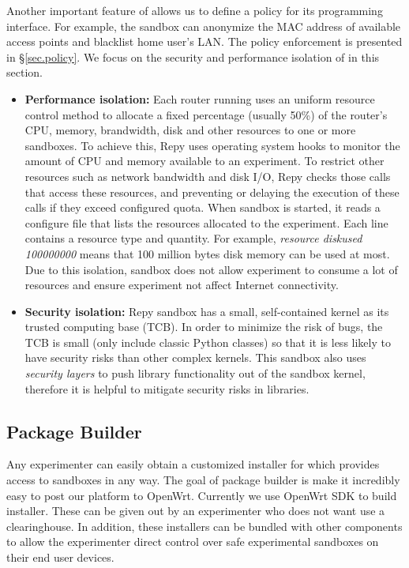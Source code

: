 Another important feature of \sandboxname allows us to define a policy for its programming interface. For example, the sandbox can anonymize the MAC address of available access points and blacklist home user's LAN. The policy enforcement is presented in \S{\ref{sec.policy}}. We focus on the security and performance isolation of \sandboxname in this section.
\begin{itemize}
\item \textbf{Performance isolation: }Each router running \sysname uses an uniform resource control method to allocate a fixed percentage (usually 50\%) of the router's CPU, memory, brandwidth, disk and other resources to one or more sandboxes. To achieve this, Repy uses operating system hooks to monitor the amount of CPU and memory available to an experiment. To restrict other resources such as network bandwidth and disk I/O, Repy checks those calls that access these resources, and preventing or delaying the execution of these calls if they exceed configured quota. When sandbox is started, it reads a configure file that lists the resources allocated to the experiment. Each line contains a resource type and quantity. For example, \textit{resource diskused 100000000} means that 100 million bytes disk memory can be used at most. Due to this isolation, sandbox does not allow experiment to consume a lot of resources and ensure experiment not affect Internet connectivity.

\item \textbf{Security isolation: }Repy sandbox has a small, self-contained kernel as its trusted computing base (TCB). In order to minimize the risk of bugs, the TCB is small (only include classic Python classes) so that it is less likely to have security risks than other complex kernels. This sandbox also uses \textit{security layers} to push library functionality out of the sandbox kernel, therefore it is helpful to mitigate security risks in libraries. 

\end{itemize}
\subsection{Package Builder}
\label{sec.packagebuilder}
Any experimenter can easily obtain a customized installer for \sysname which provides access to sandboxes in any way. The goal of package builder is make it incredibly easy to post our platform to OpenWrt. Currently we use OpenWrt SDK to build installer. These can be given out by an experimenter who does not want use a clearinghouse. In addition, these installers can be bundled with other components to allow the experimenter direct control over safe experimental sandboxes on their end user devices.

